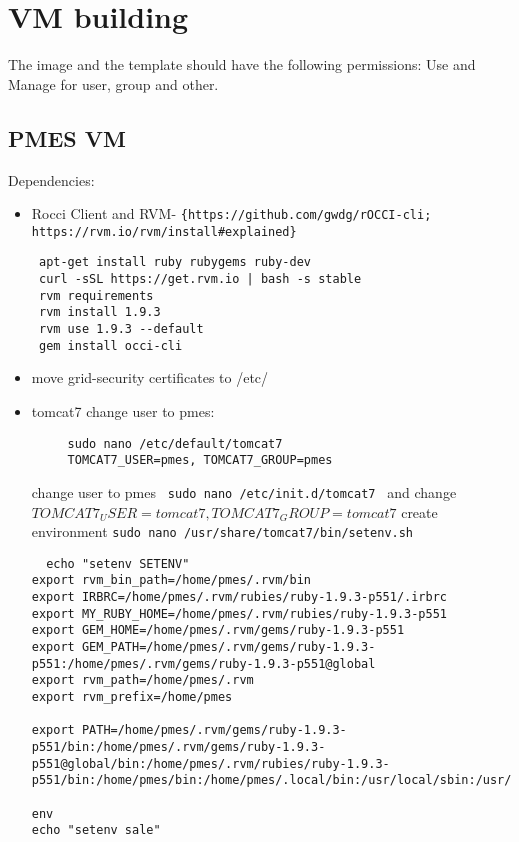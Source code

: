 \documentclass[a4paper,10pt]{article}
\begin{document}
\section{VM building}
The image and the template should have the following permissions: Use and Manage for user, group and other.
\subsection{PMES VM}
Dependencies:
\begin{itemize}

 \item Rocci Client and RVM- \verb|{https://github.com/gwdg/rOCCI-cli; https://rvm.io/rvm/install#explained}|
 \begin{lstlisting}
 apt-get install ruby rubygems ruby-dev
 curl -sSL https://get.rvm.io | bash -s stable
 rvm requirements
 rvm install 1.9.3
 rvm use 1.9.3 --default
 gem install occi-cli
 \end{lstlisting}
 \item move grid-security certificates to /etc/
 \item tomcat7
 \subitem change user to pmes:
 \begin{verbatim}
     sudo nano /etc/default/tomcat7
     TOMCAT7_USER=pmes, TOMCAT7_GROUP=pmes
 \end{verbatim}

 \subitem change user to pmes 
\texttt{ sudo nano /etc/init.d/tomcat7 } and change $TOMCAT7_USER=tomcat7, TOMCAT7_GROUP=tomcat7$
 \subitem create environment \texttt{sudo nano /usr/share/tomcat7/bin/setenv.sh}
 \begin{verbatim}
  echo "setenv SETENV"
export rvm_bin_path=/home/pmes/.rvm/bin
export IRBRC=/home/pmes/.rvm/rubies/ruby-1.9.3-p551/.irbrc
export MY_RUBY_HOME=/home/pmes/.rvm/rubies/ruby-1.9.3-p551
export GEM_HOME=/home/pmes/.rvm/gems/ruby-1.9.3-p551
export GEM_PATH=/home/pmes/.rvm/gems/ruby-1.9.3-p551:/home/pmes/.rvm/gems/ruby-1.9.3-p551@global
export rvm_path=/home/pmes/.rvm
export rvm_prefix=/home/pmes

export PATH=/home/pmes/.rvm/gems/ruby-1.9.3-p551/bin:/home/pmes/.rvm/gems/ruby-1.9.3-p551@global/bin:/home/pmes/.rvm/rubies/ruby-1.9.3-p551/bin:/home/pmes/bin:/home/pmes/.local/bin:/usr/local/sbin:/usr/local/bin:/usr/sbin:/usr/bin:/sbin:/bin:/usr/games:/usr/local/games:/snap/bin:/home/pmes/.rvm/bin

env
echo "setenv sale"

 \end{verbatim}

 
 \end{itemize}
\end{document}
